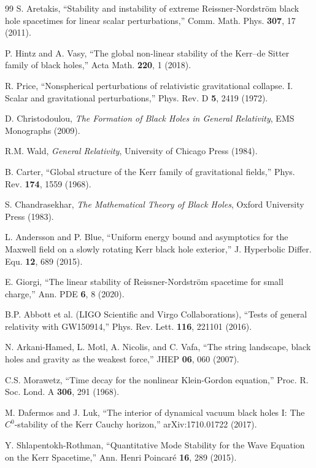 \documentclass[12pt,a4paper]{article}
\begin{document}
\begin{thebibliography}{99}
S. Aretakis, ``Stability and instability of extreme Reissner-Nordström black hole spacetimes for linear scalar perturbations,'' Comm. Math. Phys. \textbf{307}, 17 (2011).

P. Hintz and A. Vasy, ``The global non-linear stability of the Kerr–de Sitter family of black holes,'' Acta Math. \textbf{220}, 1 (2018).

R. Price, ``Nonspherical perturbations of relativistic gravitational collapse. I. Scalar and gravitational perturbations,'' Phys. Rev. D \textbf{5}, 2419 (1972).

D. Christodoulou, \textit{The Formation of Black Holes in General Relativity}, EMS Monographs (2009).

R.M. Wald, \textit{General Relativity}, University of Chicago Press (1984).

B. Carter, ``Global structure of the Kerr family of gravitational fields,'' Phys. Rev. \textbf{174}, 1559 (1968).

S. Chandrasekhar, \textit{The Mathematical Theory of Black Holes}, Oxford University Press (1983).

L. Andersson and P. Blue, ``Uniform energy bound and asymptotics for the Maxwell field on a slowly rotating Kerr black hole exterior,'' J. Hyperbolic Differ. Equ. \textbf{12}, 689 (2015).

E. Giorgi, ``The linear stability of Reissner-Nordström spacetime for small charge,'' Ann. PDE \textbf{6}, 8 (2020).

B.P. Abbott et al. (LIGO Scientific and Virgo Collaborations), ``Tests of general relativity with GW150914,'' Phys. Rev. Lett. \textbf{116}, 221101 (2016).

N. Arkani-Hamed, L. Motl, A. Nicolis, and C. Vafa, ``The string landscape, black holes and gravity as the weakest force,'' JHEP \textbf{06}, 060 (2007).

C.S. Morawetz, ``Time decay for the nonlinear Klein-Gordon equation,'' Proc. R. Soc. Lond. A \textbf{306}, 291 (1968).

M. Dafermos and J. Luk, ``The interior of dynamical vacuum black holes I: The $C^0$-stability of the Kerr Cauchy horizon,'' arXiv:1710.01722 (2017).

Y. Shlapentokh-Rothman, ``Quantitative Mode Stability for the Wave Equation on the Kerr Spacetime,'' Ann. Henri Poincaré \textbf{16}, 289 (2015).


\end{thebibliography}
\end{document}
